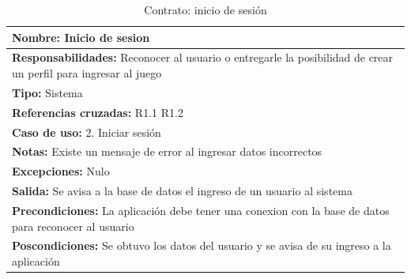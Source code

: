 \begin{table}[H]
    \begin{center}
        \begin{tabular}{|m{15cm} |}         
        	\hline 
        	\textbf{Nombre:} Inicio de sesion \\
        	\hline
        	\textbf{Responsabilidades:} Reconocer al usuario o entregarle la posibilidad de crear un perfil para ingresar al juego\\
        	\hline
        	\textbf{Tipo:} Sistema \\
        	\hline
        	\textbf{Referencias cruzadas:} R1.1 R1.2\\
        	\hline
        	\textbf{Caso de uso:} 2. Iniciar sesión\\
        	\hline
        	\textbf{Notas:} Existe un mensaje de error al ingresar datos incorrectos\\
        	\hline
        	\textbf{Excepciones:} Nulo\\
        	\hline
        	\textbf{Salida:} Se avisa a la base de datos el ingreso de un usuario al sistema\\
        	\hline
        	\textbf{Precondiciones:} La aplicación debe tener una conexion con la base de datos para reconocer al usuario \\
        	\hline
        	\textbf{Poscondiciones:} Se obtuvo los datos del usuario y se avisa de su ingreso a la aplicación\\
        	\hline
        \end{tabular}
    \caption{Contrato: inicio de sesión}
    \label{Contrato2}
    \end{center}
\end{table}


